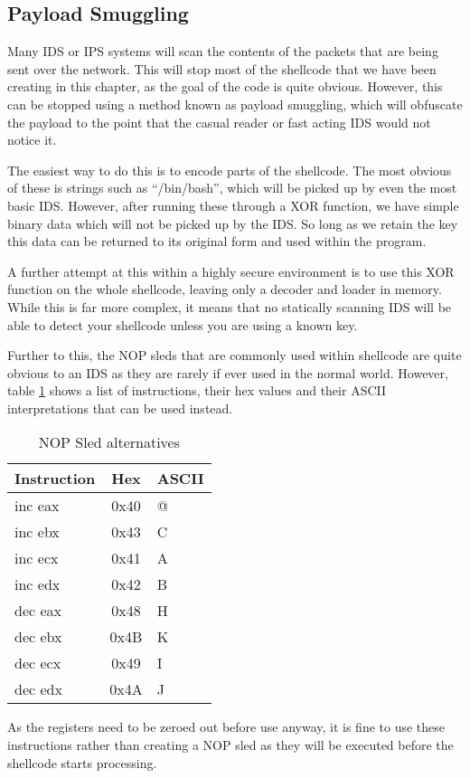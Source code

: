 		\subsection{Payload Smuggling}
			Many IDS or IPS systems will scan the contents of the packets that are being sent over the network.
			This will stop most of the shellcode that we have been creating in this chapter, as the goal of the code is quite obvious.
			However, this can be stopped using a method known as payload smuggling, which will obfuscate the payload to the point that the casual reader or fast acting IDS would not notice it.

			The easiest way to do this is to encode parts of the shellcode.
			The most obvious of these is strings such as ``/bin/bash'', which will be picked up by even the most basic IDS.
			However, after running these through a XOR function, we have simple binary data which will not be picked up by the IDS.
			So long as we retain the key this data can be returned to its original form and used within the program.

			A further attempt at this within a highly secure environment is to use this XOR function on the whole shellcode, leaving only a decoder and loader in memory.
			While this is far more complex, it means that no statically scanning IDS will be able to detect your shellcode unless you are using a known key.

			Further to this, the NOP sleds that are commonly used within shellcode are quite obvious to an IDS as they are rarely if ever used in the normal world.
			However, table \ref{tab:NOPAlternatives} shows a list of instructions, their hex values and their ASCII interpretations that can be used instead.
			\begin{table}[htb]
				\centering
				\begin{adjustbox}{max width=1\textwidth}
				\begin{tabular}{lcl}
					\toprule
					\textbf{Instruction} & \textbf{Hex} & \textbf{ASCII} \\ \hline
					\toprule
					inc eax	& 0x40 & @ \\
					inc ebx & 0x43 & C \\
					inc ecx & 0x41 & A \\
					inc edx & 0x42 & B \\
					dec eax & 0x48 & H \\
					dec ebx & 0x4B & K \\
					dec ecx & 0x49 & I \\
					dec edx & 0x4A & J \\
					\bottomrule
				\end{tabular}
			\end{adjustbox}
				\caption{NOP Sled alternatives}
				\label{tab:NOPAlternatives}
			\end{table}
			As the registers need to be zeroed out before use anyway, it is fine to use these instructions rather than creating a NOP sled as they will be executed before the shellcode starts processing.

